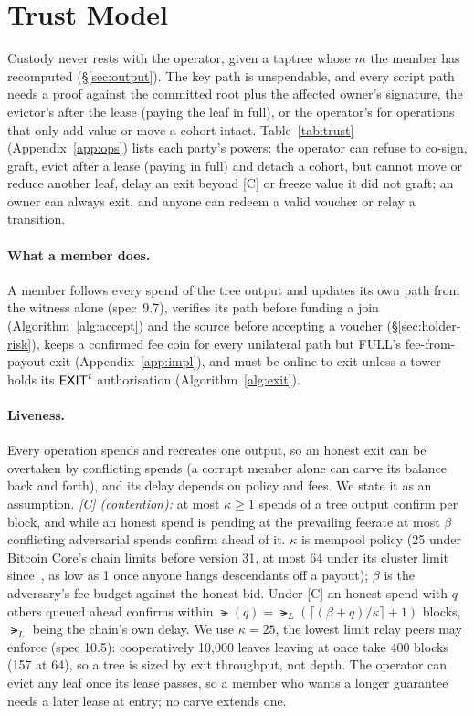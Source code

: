 \section{Trust Model}\label{sec:trust}

Custody never rests with the operator, given a taptree whose $m$ the
member has recomputed (\S\ref{sec:output}). The key path is unspendable,
and every script path needs a proof against the committed root plus the
affected owner's signature, the evictor's after the lease (paying the
leaf in full), or the operator's for operations that only add value or
move a cohort intact.
Table~\ref{tab:trust} (Appendix~\ref{app:ops}) lists each party's powers: the operator can refuse to co-sign, graft, evict after a lease (paying in full) and detach a cohort, but cannot move or reduce another leaf, delay an exit beyond [C] or freeze value it did not graft; an owner can always exit, and anyone can redeem a valid voucher or relay a transition.



\paragraph{What a member does.} A member follows every spend of the tree
output and updates its own path from the witness alone (spec~9.7),
verifies its path before funding a join (Algorithm~\ref{alg:accept}) and
the source before accepting a voucher (\S\ref{sec:holder-risk}), keeps a
confirmed fee coin for every unilateral path but FULL's fee-from-payout
exit (Appendix~\ref{app:impl}), and must be online to exit unless a tower
holds its $\textsf{EXIT}^{t}$ authorisation (Algorithm~\ref{alg:exit}).

\paragraph{Liveness.}\label{sec:liveness} Every operation spends and
recreates one output, so an honest exit can be overtaken by conflicting
spends (a corrupt member alone can carve its balance back and forth),
and its delay depends on policy and fees. We state it as an assumption.
\emph{[C] (contention):} at most $\kappa \ge 1$ spends of a tree output
confirm per block, and while an honest spend is pending at the
prevailing feerate at most $\beta$ conflicting adversarial spends
confirm ahead of it. $\kappa$ is mempool policy (25 under Bitcoin Core's
chain limits before version 31, at most 64 under its cluster limit
since~\cite{corepolicy,clustermempool}, as low as 1 once anyone hangs
descendants off a payout); $\beta$ is the adversary's fee budget against
the honest bid. Under [C] an honest spend with $q$ others queued ahead
confirms within $\lat(q) = \lat_L(\lceil (\beta + q)/\kappa \rceil + 1)$
blocks, $\lat_L$ being the chain's own delay. We use $\kappa = 25$, the
lowest limit relay peers may enforce (spec 10.5): cooperatively
10{,}000 leaves leaving at once take 400 blocks (157 at 64), so a tree
is sized by exit throughput, not depth. The operator
can evict any leaf once its lease passes, so a member who wants a longer
guarantee needs a later lease at entry; no carve extends one.
